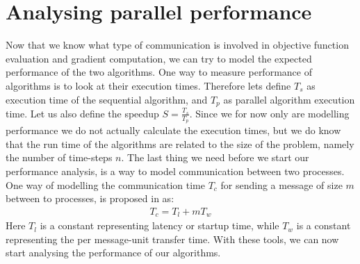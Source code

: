 \section{Analysing parallel performance}
Now that we know what type of communication is involved in objective function evaluation and gradient computation, we can try to model the expected performance of the two algorithms. One way to measure performance of algorithms is to look at their execution times. Therefore lets define $T_s$ as execution time of the sequential algorithm, and $T_p$ as parallel algorithm execution time. Let us also define the speedup $S=\frac{T_s}{T_p}$. Since we for now only are modelling performance we do not actually calculate the execution times, but we do know that the run time of the algorithms are related to the size of the problem, namely the number of time-steps $n$. The last thing we need before we start our performance analysis, is a way to model communication between two processes. One way of modelling the communication time $T_c$ for sending a message of size $m$ between to processes, is proposed in \cite{grama2003introduction} as:
\begin{align*}
T_c = T_l + mT_w
\end{align*} 
Here $T_l$ is a constant representing latency or startup time, while $T_w$ is a constant representing the per message-unit transfer time. With these tools, we can now start analysing the performance of our algorithms.
